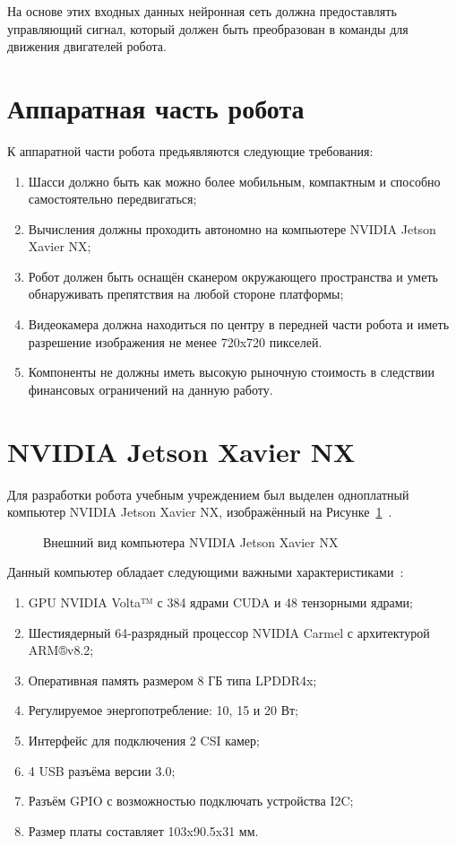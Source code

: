 На основе этих входных данных нейронная сеть должна предоставлять управляющий сигнал, который должен быть преобразован в команды для движения двигателей робота.

\section{Аппаратная часть робота}\label{sec:ch1/sec3}

К аппаратной части робота предьявляются следующие требования:
\begin{enumerate}[beginpenalty=10000] %
  \item Шасси должно быть как можно более мобильным, компактным и способно самостоятельно передвигаться;
  \item Вычисления должны проходить автономно на компьютере NVIDIA Jetson Xavier NX;
  \item Робот должен быть оснащён сканером окружающего пространства и уметь обнаруживать препятствия на любой стороне платформы;
  \item Видеокамера должна находиться по центру в передней части робота и иметь разрешение изображения не менее 720x720 пикселей.
  \item Компоненты не должны иметь высокую рыночную стоимость в следствии финансовых ограничений на данную работу.
\end{enumerate}

\section{NVIDIA Jetson Xavier NX}
Для разработки робота учебным учреждением был выделен одноплатный компьютер NVIDIA Jetson Xavier NX, изображённый на Рисунке~\cref{fig:xavier}~\cite{xavier}.

\begin{figure}[ht]
    \caption{Внешний вид компьютера NVIDIA Jetson Xavier NX}\label{fig:xavier}
\end{figure}

Данный компьютер обладает следующими важными характеристиками~\cite{xavier}:

\begin{enumerate}[beginpenalty=10000] %
  \item GPU NVIDIA Volta™ с 384 ядрами CUDA и 48 тензорными ядрами;
  \item Шестиядерный 64-разрядный процессор NVIDIA Carmel с архитектурой ARM®v8.2;
  \item Оперативная память размером 8 ГБ типа LPDDR4x;
  \item Регулируемое энергопотребление: 10, 15 и 20 Вт;
  \item Интерфейс для подключения 2 CSI камер;
  \item 4 USB разъёма версии 3.0;
  \item Разъём GPIO с возможностью подключать устройства I2C;
  \item Размер платы составляет 103x90.5x31 мм.
\end{enumerate}

\FloatBarrier
